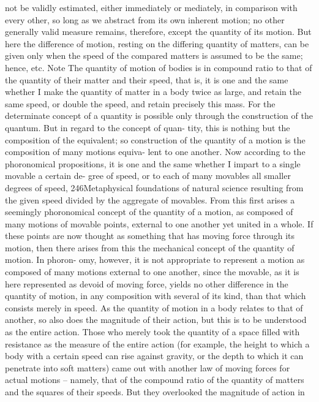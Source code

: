 not be validly estimated, either immediately or mediately, in comparison
with every other, so long as we abstract from its own inherent motion;
no other generally valid measure remains, therefore, except the quantity
of its motion. But here the difference of motion, resting on the differing
quantity of matters, can be given only when the speed of the compared
matters is assumed to be the same; hence, etc.
Note
The quantity of motion of bodies is in compound ratio to that of the
quantity of their matter and their speed, that is, it is one and the same
whether I make the quantity of matter in a body twice as large, and
retain the same speed, or double the speed, and retain precisely this
mass. For the determinate concept of a quantity is possible only through
the construction of the quantum. But in regard to the concept of quan-
tity, this is nothing but the composition of the equivalent; so construction
of the quantity of a motion is the composition of many motions equiva-
lent to one another. Now according to the phoronomical propositions,
it is one and the same whether I impart to a single movable a certain de-
gree of speed, or to each of many movables all smaller degrees of speed,
246Metaphysical foundations of natural science
resulting from the given speed divided by the aggregate of movables.
From this ﬁrst arises a seemingly phoronomical concept of the quantity
of a motion, as composed of many motions of movable points, external
to one another yet united in a whole. If these points are now thought
as something that has moving force through its motion, then there arises
from this the mechanical concept of the quantity of motion. In phoron-
omy, however, it is not appropriate to represent a motion as composed
of many motions external to one another, since the movable, as it is here
represented as devoid of moving force, yields no other difference in the
quantity of motion, in any composition with several of its kind, than
that which consists merely in speed. As the quantity of motion in a body
relates to that of another, so also does the magnitude of their action,
but this is to be understood as the entire action. Those who merely took
the quantity of a space ﬁlled with resistance as the measure of the entire
action (for example, the height to which a body with a certain speed
can rise against gravity, or the depth to which it can penetrate into soft
matters) came out with another law of moving forces for actual motions –
namely, that of the compound ratio of the quantity of matters and the
squares of their speeds. But they overlooked the magnitude of action in
